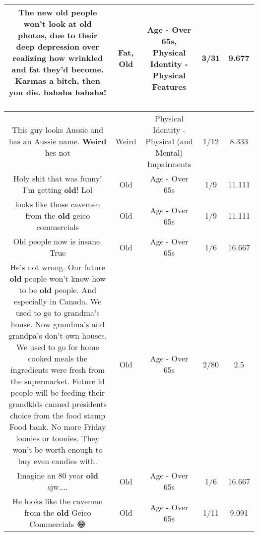\documentclass[11pt]{article}
\newlength\mylength
\begin{document}
\begin{center}
\begin{longtable}{|C{.65\mylength}|C{.30\mylength}|C{.12\mylength}|C{.12\mylength}|C{.12\mylength}|}
  \small The new \textbf{old} people won't look at \textbf{old} photos, due to their deep depression over realizing how wrinkled and \textbf{fat} they'd become.  Karmas a bitch, then you die.   hahaha hahaha! 👴👵👴👵👴👵👴👵👴\normalsize   & Fat, Old & Age - Over 65s, Physical Identity - Physical Features & 3/31 & 9.677 \\  \hline
  \small This guy looks Aussie and has an Aussie name. \textbf{Weird} hes not\normalsize   & Weird & Physical Identity - Physical (and Mental) Impairments & 1/12 & 8.333 \\  \hline
  \small Holy shit that was funny! I'm getting \textbf{old}! Lol\normalsize   & Old & Age - Over 65s & 1/9 & 11.111 \\  \hline
  \small looks like those cavemen from the \textbf{old} geico commercials\normalsize   & Old & Age - Over 65s & 1/9 & 11.111 \\  \hline
  \small Old people now is insane. True\normalsize   & Old & Age - Over 65s & 1/6 & 16.667 \\  \hline
  \small He's not wrong. Our future \textbf{old} people won't know how to be \textbf{old} people. And especially in Canada. We used to go to grandma's house. Now grandma's and grandpa's don't own houses. We used to go for home cooked meals the ingredients were fresh from the supermarket. Future ld people will be feeding their grandkids canned presidents choice from the food stamp Food bank. No more Friday loonies or toonies. They won't be worth enough to buy even candies with.\normalsize   & Old & Age - Over 65s & 2/80 & 2.5 \\  \hline
  \small Imagine an 80 year \textbf{old} sjw....\normalsize   & Old & Age - Over 65s & 1/6 & 16.667 \\  \hline
  \small He looks like the caveman from the \textbf{old} Geico Commercials 😂\normalsize   & Old & Age - Over 65s & 1/11 & 9.091 \\  \hline

\end{longtable}
\end{center}
\end{document}
